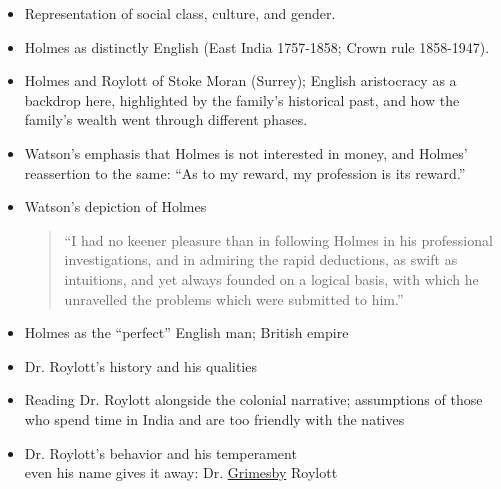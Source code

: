\documentclass[a4paper,landscape,headrule,footrule,xetex]{foils}
\begin{document}
\begin{itemize}           
  \item Representation of social class, culture, and gender.     
  \item Holmes as distinctly English (East India 1757-1858; Crown rule 1858-1947).      
  \item Holmes and Roylott of Stoke Moran (Surrey); English aristocracy as a backdrop here, highlighted by the family’s historical past, and how the family’s wealth went through different phases.     
  \item Watson’s emphasis that Holmes is not interested in money, and
    Holmes’ reassertion to the same: “As to my reward, my profession
    is its reward.” 
  \end{itemize}

\begin{itemize} 

  \item Watson’s depiction of Holmes
    \begin{quote}
      “I had no keener pleasure than in following Holmes in his
      professional investigations, and in admiring the rapid
      deductions, as swift as intuitions, and yet always founded on a
      logical basis, with which he unravelled the problems which were
      submitted to him.”
    \end{quote}
  \item Holmes as the “perfect” English man; British empire
  \item Dr. Roylott’s history and his qualities
  \item Reading Dr. Roylott alongside the colonial narrative;
    assumptions of those who spend time in India and are too friendly
    with the natives
   
\item Dr. Roylott’s behavior and his temperament
\\ even his name gives it away: Dr. \ul{Grimesby} Roylott
  \end{itemize}
\end{document}
